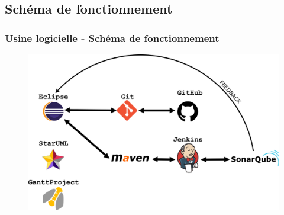 \documentclass{beamer}
\begin{document}
\subsection{Schéma de fonctionnement}
\begin{frame}[label=schemaFonctionnement]
  \frametitle{Usine logicielle - Schéma de fonctionnement}
\begin{figure}[H]
\label{schema}
  \centering
      \includegraphics[width=1.0\textwidth]{usine_vitameal.png} %
\end{figure}
\end{frame}
\end{document}
